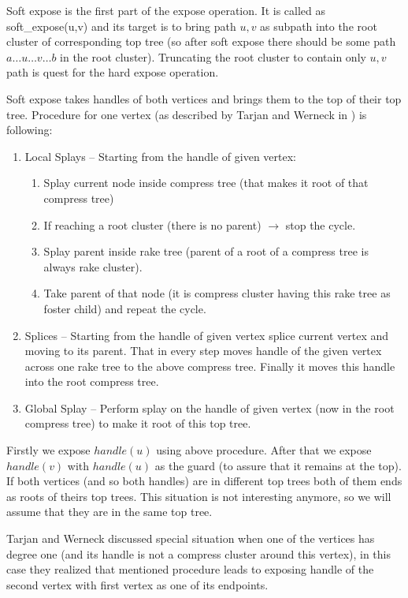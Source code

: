 Soft expose is the first part of the expose operation. It is called as
{\I soft\_expose(u,v)} and its target is to bring path $u,v$ as subpath into
the root cluster of corresponding top tree (so after soft expose there should
be some path $a\dots u\dots v\dots b$ in the root cluster). Truncating the root
cluster to contain only $u,v$ path is quest for the hard expose operation.

Soft expose takes handles of both vertices and brings them to the top of their
top tree. Procedure for one vertex (as described by Tarjan and Werneck in
\cite{SelfAdjustingTT}) is following:

\begin{enumerate}
\item Local Splays -- Starting from the handle of given vertex:
  \begin{enumerate}
  \item Splay current node inside compress tree (that makes it root of that compress tree)
  \item If reaching a root cluster (there is no parent) $\rightarrow$ stop the cycle.
  \item Splay parent inside rake tree (parent of a root of a compress tree is always rake cluster).
  \item Take parent of that node (it is compress cluster having this rake tree as foster child)
  and repeat the cycle.
  \end{enumerate}
\item Splices -- Starting from the handle of given vertex splice current vertex and
moving to its parent. That in every step moves handle of the given vertex across
one rake tree to the above compress tree. Finally it moves this handle into the
root compress tree.
\item Global Splay -- Perform splay on the handle of given vertex (now in the
root compress tree) to make it root of this top tree.
\end{enumerate}

Firstly we expose $handle(u)$ using above procedure. After that we expose
$handle(v)$ with $handle(u)$ as the guard (to assure that it remains
at the top). If both vertices (and so both handles) are in different top trees
both of them ends as roots of theirs top trees. This situation is not interesting
anymore, so we will assume that they are in the same top tree.

Tarjan and Werneck discussed special situation when one of the vertices has
degree one (and its handle is not a compress cluster around this vertex), in
this case they realized that mentioned procedure leads to exposing handle of the
second vertex with first vertex as one of its endpoints.

